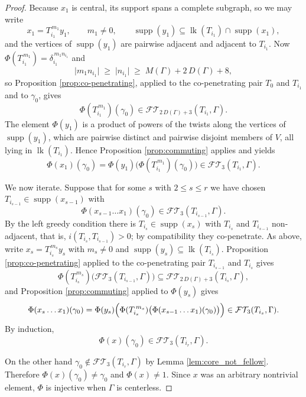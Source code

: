 \documentclass[12pt,a4paper]{amsart}
\numberwithin{equation}{section}
\theoremstyle{plain}
\theoremstyle{definition}
\theoremstyle{remark}
\begin{document}
\begin{proof}
    Because $x_1$ is central, its support spans a complete subgraph, so we may write
    \[
        x_1 = T_{i_1}^{\,m_1} y_1,
        \qquad m_1 \ne 0,
        \qquad \operatorname{supp}(y_1) \subseteq \operatorname{lk}(T_{i_1}) \cap \operatorname{supp}(x_1),
    \]
    and the vertices of $\operatorname{supp}(y_1)$ are pairwise adjacent and adjacent to $T_{i_1}$.
    Now $\Phi(T_{i_1}^{\,m_1}) = \delta_{i_1}^{\,m_1 n_{i_1}}$ and
    \[
        \lvert m_1 n_{i_1} \rvert \;\ge\; \lvert n_{i_1} \rvert \;\ge\; M(\Gamma) + 2\,D(\Gamma) + 8 ,
    \]
    so Proposition \ref{prop:co-penetrating}, applied to the co-penetrating pair $T_0$ and $T_{i_1}$ and to $\gamma_0$, gives
    \[
        \Phi(T_{i_1}^{\,m_1})(\gamma_0) \in \mathcal{FT}\!_{2\,D(\Gamma)+3}(T_{i_1}, \Gamma).
    \]
    The element $\Phi(y_1)$ is a product of powers of the twists along the vertices of $\operatorname{supp}(y_1)$, which are pairwise distinct and pairwise disjoint members of $V$, all lying in $\operatorname{lk}(T_{i_1})$.
    Hence Proposition \ref{prop:commuting} applies and yields
    \[
        \Phi(x_1)(\gamma_0) = \Phi(y_1)\bigl(\Phi(T_{i_1}^{\,m_1})(\gamma_0)\bigr) \in \mathcal{FT}\!_3(T_{i_1}, \Gamma).
    \]

    We now iterate.
    Suppose that for some $s$ with $2 \le s \le r$ we have chosen $T_{i_{s-1}} \in \operatorname{supp}(x_{s-1})$ with
    \[
        \Phi(x_{s-1} \dots x_1)(\gamma_0) \in \mathcal{FT}\!_3(T_{i_{s-1}}, \Gamma).
    \]
    By the left greedy condition there is $T_{i_s} \in \operatorname{supp}(x_s)$ with $T_{i_s}$ and $T_{i_{s-1}}$ non-adjacent, that is, $i(T_{i_s}, T_{i_{s-1}}) > 0$; by compatibility they co-penetrate.
    As above, write $x_s = T_{i_s}^{\,m_s} y_s$ with $m_s \ne 0$ and $\operatorname{supp}(y_s) \subseteq \operatorname{lk}(T_{i_s})$.
    Proposition \ref{prop:co-penetrating} applied to the co-penetrating pair $T_{i_{s-1}}$ and $T_{i_s}$ gives
    \[
        \Phi(T_{i_s}^{\,m_s})\bigl(\mathcal{FT}\!_3(T_{i_{s-1}}, \Gamma)\bigr) \subseteq \mathcal{FT}\!_{2\,D(\Gamma)+3}(T_{i_s}, \Gamma),
    \]
    and Proposition \ref{prop:commuting} applied to $\Phi(y_s)$ gives
    \[
        \Phi(x_s \dots x_1)(\gamma_0)
        = \Phi(y_s)\Bigl(\Phi(T_{i_s}^{\,m_s})\bigl(\Phi(x_{s-1}\dots x_1)(\gamma_0)\bigr)\Bigr)
        \in \mathcal{FT}\!_3(T_{i_s}, \Gamma).
    \]
    By induction,
    \[
        \Phi(x)(\gamma_0) \in \mathcal{FT}\!_3(T_{i_r}, \Gamma).
    \]

    On the other hand $\gamma_0 \notin \mathcal{FT}\!_3(T_{i_r}, \Gamma)$ by Lemma \ref{lem:core_not_fellow}.
    Therefore $\Phi(x)(\gamma_0) \ne \gamma_0$ and $\Phi(x) \ne 1$.
    Since $x$ was an arbitrary nontrivial element, $\Phi$ is injective when $\Gamma$ is centerless.
    

\end{proof}
\end{document}
